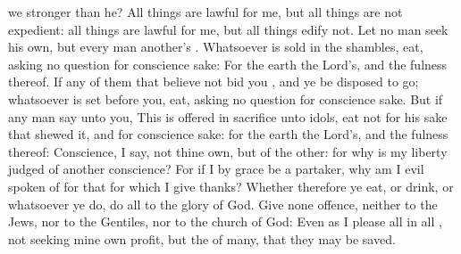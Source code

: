 {we
stronger than
he?
All
things are
lawful for
me,
but all
things
are
not
expedient: all
things are
lawful for
me,
but all
things
edify
not.
Let no
man
seek his
own,
but every
man
another’s
{}.
Whatsoever is
sold
in the
shambles,
{}
eat,
asking
no
question
for conscience
sake:
For the
earth
{} the
Lord’s,
and the
fulness
thereof.
If
any of
them that believe
not
bid
you
{},
and ye be
disposed to
go;
whatsoever is set
before
you,
eat,
asking
no
question
for conscience
sake.
But
if any
man
say unto
you,
This
is offered in sacrifice unto
idols,
eat
not
for his sake
that shewed
it,
and for conscience
sake:
for the
earth
{} the
Lord’s,
and the
fulness
thereof:
Conscience, I
say,
not thine
own,
but of the
other:
for
why is
my
liberty
judged
of
another
{}
conscience?
For
if
I by
grace be a
partaker,
why am I evil spoken
of
for that for
which
I give
thanks?
Whether
therefore ye
eat,
or
drink,
or
whatsoever ye
do,
do
all
to the
glory of
God.
Give none
offence,
neither to the
Jews,
nor to the
Gentiles,
nor to the
church of
God:
Even
as
I
please
all
{} in
all
{},
not
seeking mine
own
profit,
but
the
{} of
many,
that they may be
saved.

}

